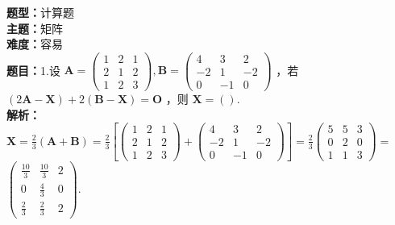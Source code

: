 \documentclass{ctexart}
\newenvironment{question}[5]{%
	\noindent\textbf{题型：}#1\\
	\textbf{主题：}#2\\
	\textbf{难度：}#3\\
	\textbf{题目：}#4\\
	\textbf{解析：}#5\\
	\vspace{1em}
}{}
\begin{document}
	\begin{question}
		{计算题}
		{矩阵}
		{容易}
		{1.设 \(\mathbf{A}=\left(\begin{array}{lll}1 & 2 & 1 \\ 2 & 1 & 2 \\ 1 & 2 & 3\end{array}\right), \mathbf{B}=\left(\begin{array}{ccc}4 & 3 & 2 \\ -2 & 1 & -2 \\ 0 & -1 & 0\end{array}\right)\) ，若 \((2 \mathbf{A}-\mathbf{X})+2(\mathbf{B}-\mathbf{X})=\mathbf{O}\) ，则 \(\mathbf{X}=()\).}
		{\(\mathbf{X}=\frac{2}{3}(\mathbf{A}+\mathbf{B})=\frac{2}{3}\left[\left(\begin{array}{lll}1 & 2 & 1 \\ 2 & 1 & 2 \\ 1 & 2 & 3\end{array}\right)+\left(\begin{array}{ccc}4 & 3 & 2 \\ -2 & 1 & -2 \\ 0 & -1 & 0\end{array}\right)\right]=\frac{2}{3}\left(\begin{array}{lll}5 & 5 & 3 \\ 0 & 2 & 0 \\ 1 & 1 & 3\end{array}\right)=\) \(\left(\begin{array}{ccc}\frac{10}{3} & \frac{10}{3} & 2 \\ 0 & \frac{4}{3} & 0 \\ \frac{2}{3} & \frac{2}{3} & 2\end{array}\right)\).}
	\end{question}
	
\end{document}
